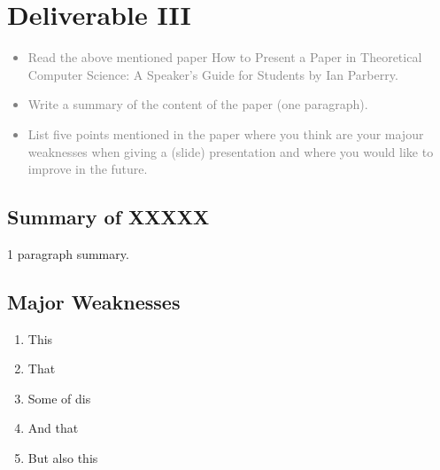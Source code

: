 \chapter{Deliverable III}
\textcolor{gray}{%
\begin{itemize}
    \item Read the above mentioned paper How to Present a Paper in Theoretical Computer Science: A Speaker’s Guide for Students by Ian Parberry.
    \item Write a summary of the content of the paper (one paragraph).
    \item List five points mentioned in the paper where you think are your majour weaknesses when giving a (slide) presentation and where you would like to improve in the future.
\end{itemize}}
\section{Summary of XXXXX}
1 paragraph summary.
\section{Major Weaknesses}
\begin{enumerate}
    \item This
    \item That
    \item Some of dis
    \item And that
    \item But also this
\end{enumerate}
